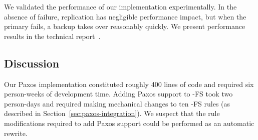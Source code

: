 

We validated the performance of our implementation experimentally. In the
absence of failure, replication has negligible performance impact, but when the
primary \NN fails, a backup \NN takes over reasonably quickly.  We present
performance results in the technical report~\cite{boom-techr}.

% 
% 

\subsection{Discussion}
Our Paxos implementation constituted roughly 400 lines of code and required six
person-weeks of development time. Adding Paxos support to \BOOM-FS took two
person-days and required making mechanical changes to ten \BOOM-FS rules (as
described in Section~\ref{sec:paxos-integration}). We suspect that the rule
modifications required to add Paxos support could be performed as an automatic
rewrite.


